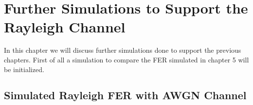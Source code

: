 \chapter{Further Simulations to Support the Rayleigh Channel} \label{chap:Experiments}
\graphicspath{{C:/Users/Kevin/Bachelarbeit/Bachelorarbeit/01_Bachelorarbeit_LaTex/02_Figures/}}

In this chapter we will discuss further simulations done to support the previous chapters. First of all a simulation to compare the \gls{FER} simulated in chapter 5 will be initialized.
\section{Simulated Rayleigh FER with AWGN Channel}
\label{RAYAWGN}

